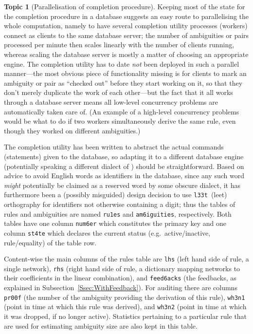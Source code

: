 \documentclass{article}
\theoremstyle{definition}
\newtheorem{topic}{Topic}
\begin{document}
\begin{topic}[Parallelisation of completion procedure]
  Keeping most of the state for the completion procedure in a database 
  suggests an easy route to parallelising the whole computation, 
  namely to have several completion utility processes (workers) 
  connect as clients to the same database server; the number of 
  ambiguities or pairs processed per minute then scales linearly with 
  the number of clients running, whereas scaling the database server 
  is mostly a matter of choosing an appropriate engine. The 
  completion utility has to date \emph{not} been deployed in such a 
  parallel manner---the most obvious piece of functionality missing 
  is for clients to mark an ambiguity or pair as ``checked out'' 
  before they start working on it, so that they don't merely 
  duplicate the work of each other---but the fact that it all works 
  through a database server means all low-level concurrency problems 
  are automatically taken care of. (An example of a high-level 
  concurrency problems would be what to do if two workers 
  simultaneously derive the same rule, even though they worked on 
  different ambiguities.)
\end{topic}

The completion utility has been written to abstract the actual 
commands (statements) given to the database, so adapting it to a 
different database engine (potentially speaking a different dialect 
of ) should be straightforward. Based on advice to avoid 
English words as identifiers in the database, since any such word 
\emph{might} potentially be claimed as a reserved word by some 
obscure  dialect, 
it has furthermore been a (possibly misguided) design decision to use 
\texttt{l33t}~(leet) orthography for identifiers not otherwise 
containing a digit; thus the tables of rules and ambiguities are 
named \texttt{ru1es} and \texttt{am6iguities}, respectively. Both 
tables have one column \texttt{num6er} which constitutes the primary 
key and one column \texttt{st4te} which declares the current status 
(e.g.~active\slash inactive, rule\slash equality) of the table row.

Content-wise the main columns of the rules table are \texttt{lhs} 
(left hand side of rule, a single network), \texttt{rhs} (right hand 
side of rule, a dictionary mapping networks to their coefficients in 
the linear combination), and \texttt{feed6acks} (the feedbacks, as 
explained in Subsection~\ref{Ssec:WithFeedback}). For auditing there 
are columns \texttt{pr00f} (the number of the ambiguity providing the 
derivation of this rule), \texttt{wh3n1} (point in time at which this 
rule was derived), and \texttt{wh3n2} (point in time at which it was 
dropped, if no longer active). Statistics pertaining to a particular 
rule that are used for estimating ambiguity size are also kept in 
this table.
\end{document}
